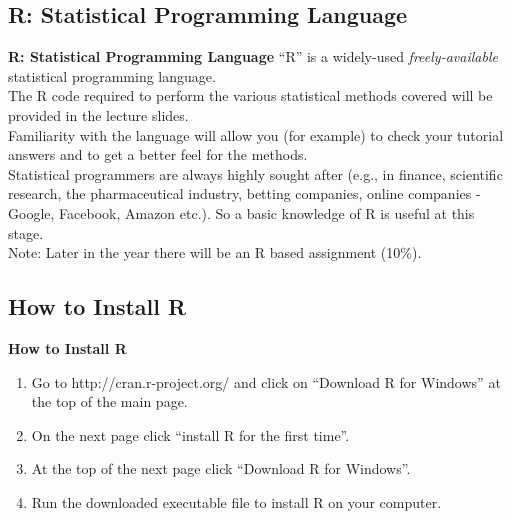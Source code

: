 \documentclass[compress]{beamer}        %
\makeatletter
\newcommand{\tcb}{\textcolor{beamer@blendedblue}}
\makeatother
\begin{document}
\subsection{R: Statistical Programming Language}
\begin{frame}{\bf \tcb{R: Statistical Programming Language}}
``R'' is a widely-used \emph{freely-available} statistical programming language.\\[0.6cm]
The R code required to perform the various statistical methods covered will be provided in the lecture slides.\\[0.6cm]
Familiarity with the language will allow you (for example) to check your tutorial answers and to get a better feel for the methods.\\[0.6cm]
Statistical programmers are always highly sought after (e.g., in finance, scientific research, the pharmaceutical industry, betting companies, online companies - Google, Facebook, Amazon etc.). So a basic knowledge of R is useful at this stage.\\[0.8cm]
Note: Later in the year there will be an R based assignment (10\%).
\end{frame}

\subsection{How to Install R}
\begin{frame}{\bf \tcb{How to Install R}}
\begin{enumerate}[1.]\itemsep0.6cm
\item Go to \tcb{http://cran.r-project.org/} and click on ``Download R for Windows'' at the top of the main page.
\item On the next page click ``install R for the first time''.
\item At the top of the next page click ``Download R for Windows''. %
\item Run the downloaded executable file to install R on your computer.
\end{enumerate}
\end{frame}
\end{document}
